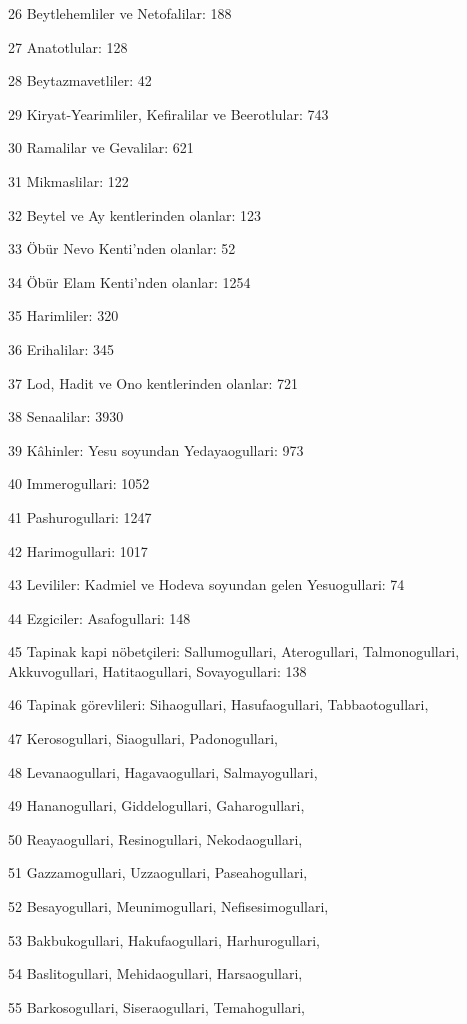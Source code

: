 \par 26 Beytlehemliler ve Netofalilar: 188
\par 27 Anatotlular: 128
\par 28 Beytazmavetliler: 42
\par 29 Kiryat-Yearimliler, Kefiralilar ve Beerotlular: 743
\par 30 Ramalilar ve Gevalilar: 621
\par 31 Mikmaslilar: 122
\par 32 Beytel ve Ay kentlerinden olanlar: 123
\par 33 Öbür Nevo Kenti'nden olanlar: 52
\par 34 Öbür Elam Kenti'nden olanlar: 1254
\par 35 Harimliler: 320
\par 36 Erihalilar: 345
\par 37 Lod, Hadit ve Ono kentlerinden olanlar: 721
\par 38 Senaalilar: 3930
\par 39 Kâhinler: Yesu soyundan Yedayaogullari: 973
\par 40 Immerogullari: 1052
\par 41 Pashurogullari: 1247
\par 42 Harimogullari: 1017
\par 43 Levililer: Kadmiel ve Hodeva soyundan gelen Yesuogullari: 74
\par 44 Ezgiciler: Asafogullari: 148
\par 45 Tapinak kapi nöbetçileri: Sallumogullari, Aterogullari, Talmonogullari, Akkuvogullari, Hatitaogullari, Sovayogullari: 138
\par 46 Tapinak görevlileri: Sihaogullari, Hasufaogullari, Tabbaotogullari,
\par 47 Kerosogullari, Siaogullari, Padonogullari,
\par 48 Levanaogullari, Hagavaogullari, Salmayogullari,
\par 49 Hananogullari, Giddelogullari, Gaharogullari,
\par 50 Reayaogullari, Resinogullari, Nekodaogullari,
\par 51 Gazzamogullari, Uzzaogullari, Paseahogullari,
\par 52 Besayogullari, Meunimogullari, Nefisesimogullari,
\par 53 Bakbukogullari, Hakufaogullari, Harhurogullari,
\par 54 Baslitogullari, Mehidaogullari, Harsaogullari,
\par 55 Barkosogullari, Siseraogullari, Temahogullari,
